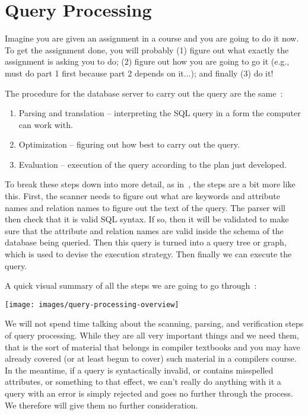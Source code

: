 




\section*{Query Processing}

Imagine you are given an assignment in a course and you are going to do it now. To get the assignment done, you will probably (1) figure out what exactly the assignment is asking you to do; (2) figure out how you are going to go it (e.g., must do part 1 first because part 2 depends on it...); and finally (3) do it! 

The procedure for the database server to carry out the query are the same~\cite{dsc}:

\begin{enumerate}
	\item Parsing and translation -- interpreting the SQL query in a form the computer can work with.
	\item Optimization -- figuring out how best to carry out the query.
	\item Evaluation -- execution of the query according to the plan just developed.
\end{enumerate}

To break these steps down into more detail, as in~\cite{fds}, the steps are a bit more like this. First, the scanner needs to figure out what are keywords and attribute names and relation names to figure out the text of the query. The parser will then check that it is valid SQL syntax. If so, then it will be validated to make sure that the attribute and relation names are valid inside the schema of the database being queried. Then this query is turned into a query tree or graph, which is used to devise the execution strategy. Then finally we can execute the query.

A quick visual summary of all the steps we are going to go through~\cite{dsc}:
\begin{center}
	\texttt{[image: images/query-processing-overview]}
\end{center}

We will not spend time talking about the scanning, parsing, and verification steps of query processing. While they are all very important things and we need them, that is the sort of material that belongs in compiler textbooks and you may have already covered (or at least begun to cover) such material in a compilers course. In the meantime, if a query is syntactically invalid, or contains misspelled attributes, or something to that effect, we can't really do anything with it a query with an error is simply rejected and  goes no further through the process. We therefore will give them no further consideration.

